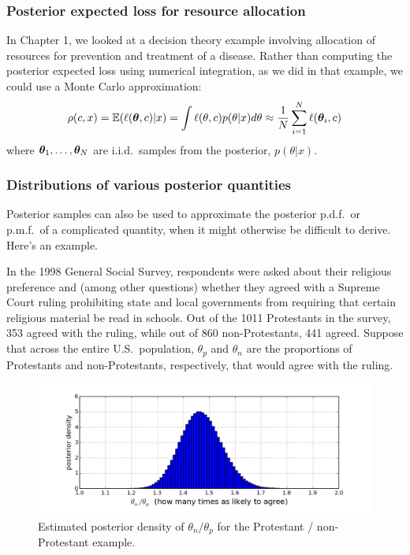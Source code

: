 \documentclass[12pt]{article}
\begin{document}
\subsubsection{Posterior expected loss for resource allocation}
In Chapter 1, we looked at a decision theory example involving allocation of resources for prevention and treatment of a disease. Rather than computing the posterior expected loss using numerical integration, as we did in that example, we could use a Monte Carlo approximation:
\begin{align*}
\rho(c,x) =\mathbb{E}(\ell({\bm\theta},c)|x) = \int \ell(\theta,c)p(\theta|x)d\theta 
\approx \frac{1}{N}\sum_{i = 1}^N \ell({\bm\theta}_i,c)
\end{align*}
where ${\bm\theta}_1,\dotsc,{\bm\theta}_N$ are i.i.d.\ samples from the posterior, $p(\theta|x)$.


\subsubsection{Distributions of various posterior quantities}
Posterior samples can also be used to approximate the posterior p.d.f.\ or p.m.f.\ of a complicated quantity, when it might otherwise be difficult to derive. Here's an example.

In the 1998 General Social Survey, respondents were asked about their religious preference and (among other questions) whether they agreed with a Supreme Court ruling prohibiting state and local governments from requiring that certain religious material be read in schools.  Out of the 1011 Protestants in the survey, 353 agreed with the ruling, while out of 860 non-Protestants, 441 agreed.
Suppose that across the entire U.S.\ population, $\theta_p$ and $\theta_n$ are the proportions of Protestants and non-Protestants, respectively, that would agree with the ruling. 

\begin{figure}
  \begin{center}
    \includegraphics[trim=0 0.65cm 0 0, clip, width=1\textwidth]{Protestant.png}
  \end{center}
  \caption{Estimated posterior density of $\theta_n/\theta_p$ for the Protestant / non-Protestant example.}
  \label{figure:Protestants}
\end{figure}
\end{document}
